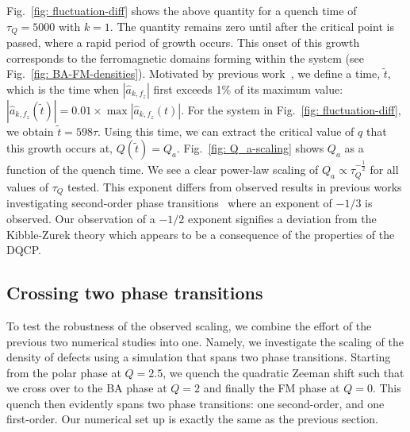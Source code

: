 Fig.~\ref{fig: fluctuation-diff} shows the above quantity for a quench time
of \(\tau_Q=5000\) with \(k=1\).
The quantity remains zero until after the critical point is passed, where
a rapid period of growth occurs.
This onset of this growth corresponds to the ferromagnetic domains forming
within the system (see Fig.~\ref{fig: BA-FM-densities}).
Motivated by previous work~\cite{Damski2007, Qiu2020}, we define a time,
\( \tilde{t} \), which is the time when \(|\hat{a}_{k, {f_z}}|\) first
exceeds 1\% of its maximum value: \(|\hat{a}_{k, {f_z}}(\tilde{t})| =
0.01\times \max|\hat{a}_{k, {f_z}}(t)|\).
For the system in Fig.~\ref{fig: fluctuation-diff}, we obtain
\(\tilde{t}=598\tau \).
Using this time, we can extract the critical value of \( q \) that this growth
occurs at, \(Q(\tilde{t}) = Q_a\).
Fig.~\ref{fig: Q_a-scaling} shows \(Q_a\) as a function of the quench time.
We see a clear power-law scaling of \(Q_a \propto \tau_Q^{-\frac{1}{2}}\) for
all values of \( \tau_Q \) tested.
This exponent differs from observed results in previous works investigating
second-order phase transitions~\cite{Damski2007, Anquez2016, Swislocki2013}
where an exponent of \(-1/3\) is observed.
Our observation of a \(-1/2\) exponent signifies a deviation from
the Kibble-Zurek theory which appears to be a consequence of the properties of
the DQCP\@.

\subsection{Crossing two phase transitions}
To test the robustness of the observed scaling, we combine the effort of the
previous two numerical studies into one.
Namely, we investigate the scaling of the density of defects using a simulation
that spans two phase transitions.
Starting from the polar phase at \(Q  = 2.5\), we quench the quadratic Zeeman
shift such that we cross over to the BA phase at \(Q=2\) and finally the FM
phase at \(Q=0\).
This quench then evidently spans two phase transitions: one second-order, and
one first-order.
Our numerical set up is exactly the same as the previous section.

